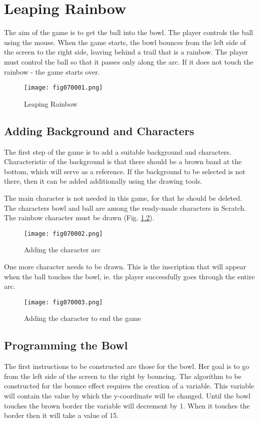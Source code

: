 \chapter{Leaping Rainbow}

The aim of the game is to get the ball into the bowl. The player controls the ball using the mouse. When the game starts, the bowl bounces from the left side of the screen to the right side, leaving behind a trail that is a rainbow. The player must control the ball so that it passes only along the arc. If it does not touch the rainbow - the game starts over.

\begin{figure}[H]
   \centering
   \texttt{[image: fig070001.png]}
   \caption{Leaping Rainbow}
\label{fig070001}
\end{figure}

\section{Adding Background and Characters}
The first step of the game is to add a suitable background and characters. Characteristic of the background is that there should be a brown band at the bottom, which will serve as a reference. If the background to be selected is not there, then it can be added additionally using the drawing tools.

The main character is not needed in this game, for that he should be deleted. The characters bowl and ball are among the ready-made characters in Scratch. The rainbow character must be drawn (Fig. \ref{fig070002}).

\begin{figure}[H]
   \centering
   \texttt{[image: fig070002.png]}
   \caption{Adding the character arc}
\label{fig070002}
\end{figure}

One more character needs to be drawn. This is the inscription that will appear when the ball touches the bowl, ie. the player successfully goes through the entire arc.

\begin{figure}[H]
   \centering
   \texttt{[image: fig070003.png]}
   \caption{Adding the character to end the game}
\label{fig070003}
\end{figure}

\section{Programming the Bowl}
The first instructions to be constructed are those for the bowl. Her goal is to go from the left side of the screen to the right by bouncing. The algorithm to be constructed for the bounce effect requires the creation of a variable. This variable will contain the value by which the y-coordinate will be changed. Until the bowl touches the brown border the variable will decrement by 1. When it touches the border then it will take a value of 15.

